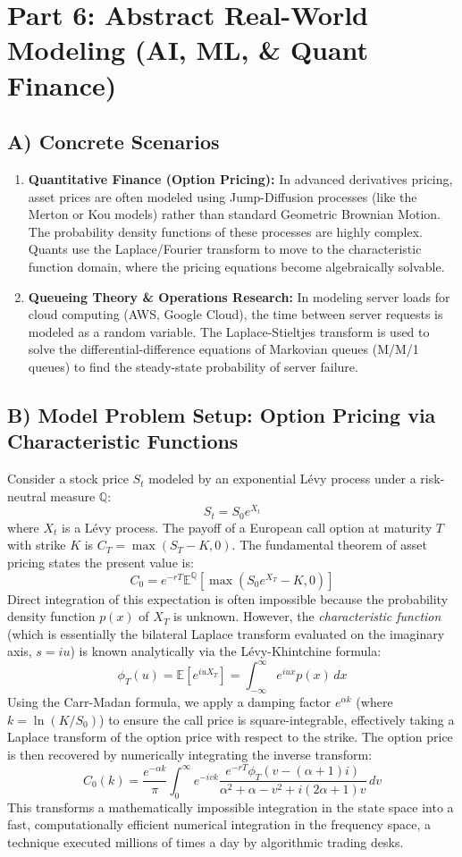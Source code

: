 \documentclass[11pt, a4paper]{article}
\theoremstyle{definition}
\theoremstyle{remark}
\begin{document}
\section{Part 6: Abstract Real-World Modeling (AI, ML, \& Quant Finance)}

\subsection{A) Concrete Scenarios}
\begin{enumerate}
    \item \textbf{Quantitative Finance (Option Pricing):} In advanced derivatives pricing, asset prices are often modeled using Jump-Diffusion processes (like the Merton or Kou models) rather than standard Geometric Brownian Motion. The probability density functions of these processes are highly complex. Quants use the Laplace/Fourier transform to move to the characteristic function domain, where the pricing equations become algebraically solvable.
    \item \textbf{Queueing Theory \& Operations Research:} In modeling server loads for cloud computing (AWS, Google Cloud), the time between server requests is modeled as a random variable. The Laplace-Stieltjes transform is used to solve the differential-difference equations of Markovian queues (M/M/1 queues) to find the steady-state probability of server failure.
\end{enumerate}

\subsection{B) Model Problem Setup: Option Pricing via Characteristic Functions}
Consider a stock price $S_t$ modeled by an exponential Lévy process under a risk-neutral measure $\mathbb{Q}$:
\[
S_t = S_0 e^{X_t}
\]
where $X_t$ is a Lévy process. The payoff of a European call option at maturity $T$ with strike $K$ is $C_T = \max(S_T - K, 0)$. The fundamental theorem of asset pricing states the present value is:
\[
C_0 = e^{-rT} \mathbb{E}^{\mathbb{Q}}[\max(S_0 e^{X_T} - K, 0)]
\]
Direct integration of this expectation is often impossible because the probability density function $p(x)$ of $X_T$ is unknown. However, the \textit{characteristic function} (which is essentially the bilateral Laplace transform evaluated on the imaginary axis, $s = iu$) is known analytically via the Lévy-Khintchine formula:
\[
\phi_T(u) = \mathbb{E}[e^{iuX_T}] = \int_{-\infty}^{\infty} e^{iux} p(x) \, dx
\]
Using the Carr-Madan formula, we apply a damping factor $e^{\alpha k}$ (where $k = \ln(K/S_0)$) to ensure the call price is square-integrable, effectively taking a Laplace transform of the option price with respect to the strike. The option price is then recovered by numerically integrating the inverse transform:
\[
C_0(k) = \frac{e^{-\alpha k}}{\pi} \int_{0}^{\infty} e^{-ivk} \frac{e^{-rT} \phi_T(v - (\alpha + 1)i)}{\alpha^2 + \alpha - v^2 + i(2\alpha + 1)v} \, dv
\]
This transforms a mathematically impossible integration in the state space into a fast, computationally efficient numerical integration in the frequency space, a technique executed millions of times a day by algorithmic trading desks.
\end{document}
